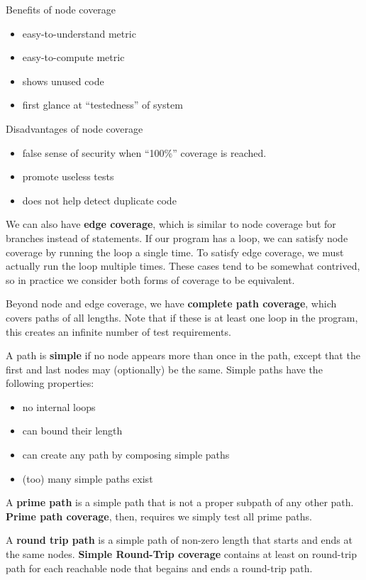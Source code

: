 \documentclass[12pt]{article}
\begin{document}
Benefits of node coverage
\begin{itemize}
\item easy-to-understand metric
\item easy-to-compute metric
\item shows unused code
\item first glance at ``testedness'' of system
\end{itemize}

Disadvantages of node coverage
\begin{itemize}
\item false sense of security when ``100\%'' coverage is reached.
\item promote useless tests
\item does not help detect duplicate code
\end{itemize}

We can also have {\bf edge coverage}, which is similar to node coverage but for branches instead of statements. If our program has a loop, we can satisfy node coverage by running the loop a single time. To satisfy edge coverage, we must actually run the loop multiple times. These cases tend to be somewhat contrived, so in practice we consider both forms of coverage to be equivalent.

Beyond node and edge coverage, we have {\bf complete path coverage}, which covers paths of all lengths. Note that if these is at least one loop in the program, this creates an infinite number of test requirements.

A path is {\bf simple} if no node appears more than once in the path, except that the first and last nodes may (optionally) be the same. Simple paths have the following properties:
\begin{itemize}
\item no internal loops
\item can bound their length
\item can create any path by composing simple paths
\item (too) many simple paths exist
\end{itemize}

A {\bf prime path} is a simple path that is not a proper subpath of any other path. {\bf Prime path coverage}, then, requires we simply test all prime paths.

A {\bf round trip path} is a simple path of non-zero length that starts and ends at the same nodes. {\bf Simple Round-Trip coverage} contains at least on round-trip path for each reachable node that begains and ends a round-trip path.
\end{document}
